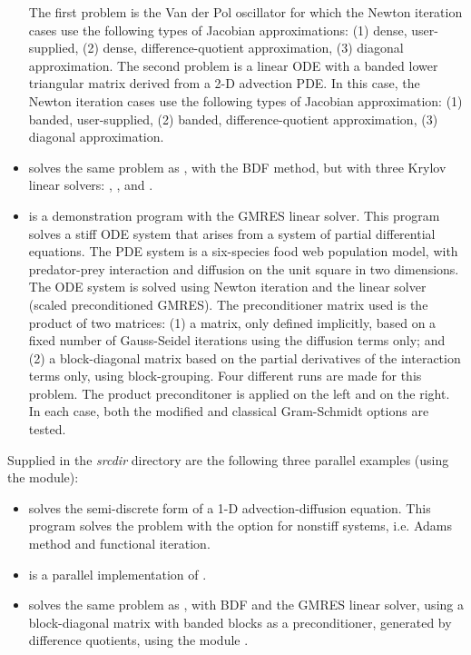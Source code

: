 \begin{itemize}
  The first problem is the Van der Pol oscillator for which 
  the Newton iteration cases use the following types of Jacobian approximations:
  (1) dense, user-supplied, (2) dense, difference-quotient approximation, 
  (3) diagonal approximation. The second problem is a linear ODE with a
  banded lower triangular matrix derived from a 2-D advection PDE. In this
  case, the Newton iteration cases use the following types of Jacobian
  approximation: (1) banded, user-supplied, (2) banded, difference-quotient
  approximation, (3) diagonal approximation.
\item {}
  solves the same problem as , with the BDF method, but with
  three Krylov linear solvers: {\cvspgmr}, {\cvspbcg}, and {\cvsptfqmr}.
\item {}
  is a demonstration program with the GMRES linear solver.
  \newline
  This program solves a stiff ODE system that arises from a system     
  of partial differential equations.  The PDE system is a six-species
  food web population model, with predator-prey interaction and diffusion 
  on the unit square in two dimensions.
  \newline
  The ODE system is solved using Newton iteration and the      
  {\cvspgmr} linear solver (scaled preconditioned GMRES).
  \newline
  The preconditioner matrix used is the product of two matrices:         
  (1) a matrix, only defined implicitly, based on a fixed number of     
  Gauss-Seidel iterations using the diffusion terms only; and               
  (2) a block-diagonal matrix based on the partial derivatives of the   
  interaction terms only, using block-grouping.                          
  \newline
  Four different runs are made for this problem.                        
  The product preconditoner is applied on the left and on the right.    
  In each case, both the modified and classical Gram-Schmidt options    
  are tested.
\end{itemize}

\vspace{0.2in}\noindent
Supplied in the {\em srcdir} directory are
the following three parallel examples (using the {\nvecp} module):
\begin{itemize}
\item {}
  solves the semi-discrete form of a 1-D advection-diffusion equation.
  \newline
  This program solves the problem with the option for nonstiff systems,
  i.e. Adams method and functional iteration.
\item {}
  is a parallel implementation of .
\item {}
  solves the same problem as , with BDF and the GMRES linear
  solver, using a block-diagonal matrix with banded blocks as a preconditioner, 
  generated by difference quotients, using the module {\cvbbdpre}.
\end{itemize}

